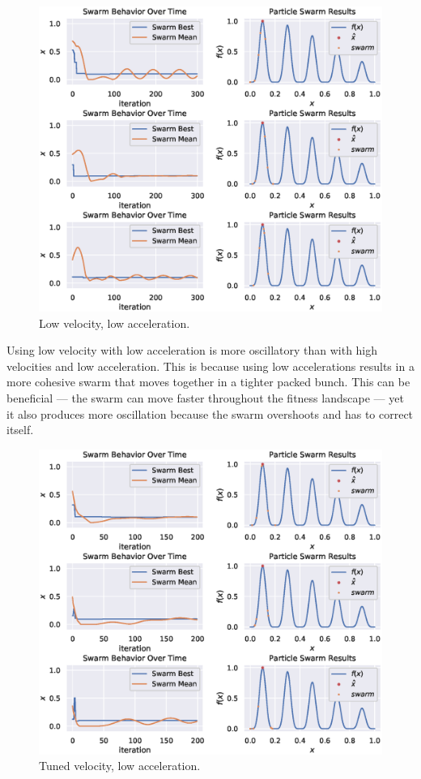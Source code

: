 \documentclass[12pt]{article}
\begin{document}
\begin{figure}[H]
    \centering
    \includegraphics[width=\textwidth]{figures/pso/pso-low-vel-low-accel.eps}
    \caption{Low velocity, low acceleration.}\label{fig:pso:low-vel-low-accel}
\end{figure}

Using low velocity with low acceleration is more oscillatory than with high velocities and low acceleration.
This is because using low accelerations results in a more cohesive swarm that moves together in a tighter packed bunch.
This can be beneficial --- the swarm can move faster throughout the fitness landscape --- yet it also produces more oscillation because the swarm overshoots and has to correct itself.

\begin{figure}[H]
    \centering
    \includegraphics[width=\textwidth]{figures/pso/pso-tuned-vel-low-accel.eps}
    \caption{Tuned velocity, low acceleration.}\label{fig:pso:tuned-vel-low-accel}
\end{figure}
\end{document}
